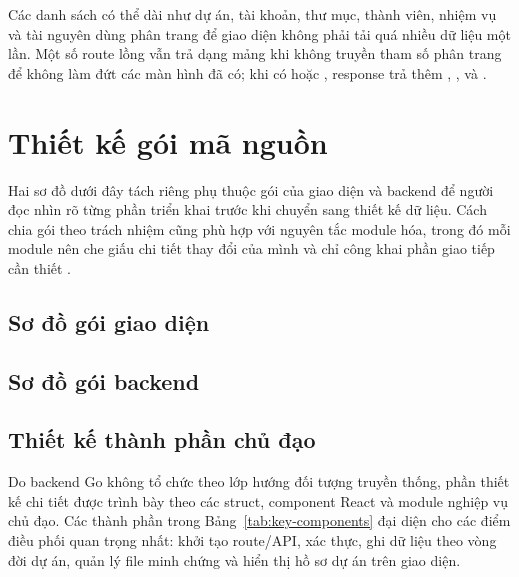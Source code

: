 Các danh sách có thể dài như dự án, tài khoản, thư mục, thành viên, nhiệm vụ và tài nguyên dùng phân trang để giao diện không phải tải quá nhiều dữ liệu một lần. Một số route lồng vẫn trả dạng mảng khi không truyền tham số phân trang để không làm đứt các màn hình đã có; khi có  hoặc , response trả thêm , ,  và .

\section{Thiết kế gói mã nguồn}

Hai sơ đồ dưới đây tách riêng phụ thuộc gói của giao diện và backend để người đọc nhìn rõ từng phần triển khai trước khi chuyển sang thiết kế dữ liệu. Cách chia gói theo trách nhiệm cũng phù hợp với nguyên tắc module hóa, trong đó mỗi module nên che giấu chi tiết thay đổi của mình và chỉ công khai phần giao tiếp cần thiết \cite{parnas1972criteria}.

\subsection{Sơ đồ gói giao diện}

\figFrontendPackageMap

\subsection{Sơ đồ gói backend}

\figBackendPackageMap

\subsection{Thiết kế thành phần chủ đạo}

Do backend Go không tổ chức theo lớp hướng đối tượng truyền thống, phần thiết kế chi tiết được trình bày theo các struct, component React và module nghiệp vụ chủ đạo. Các thành phần trong Bảng~\ref{tab:key-components} đại diện cho các điểm điều phối quan trọng nhất: khởi tạo route/API, xác thực, ghi dữ liệu theo vòng đời dự án, quản lý file minh chứng và hiển thị hồ sơ dự án trên giao diện.

